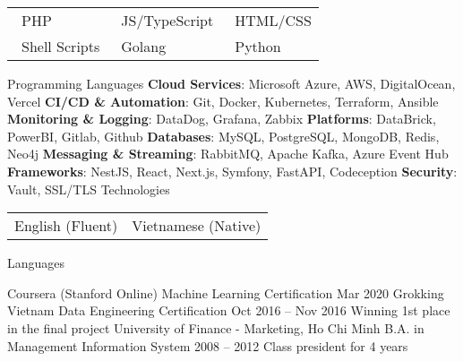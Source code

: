 \documentclass[]{awesome-cv}
\begin{document}
\newpage
{}
\begin{cventries}
	\cventry
	{\def\arraystretch{1.15}{\begin{tabular}{p{3cm}@{\hspace{0.1cm}} @{\hspace{0.1cm}}p{3cm}@{\hspace{0.1cm}} @{\hspace{0.1cm}}p{3cm}@{\hspace{0.1cm}} }
		{\faStar \, PHP} & {\faStarHalfO \, JS/TypeScript} & {\faStarHalfO \, HTML/CSS} \\
		{\faStarHalfO \, Shell Scripts} & {\faStarHalfO \, Golang} & {\faStarHalfO \, Python} \\
		\end{tabular}}}
	{Programming Languages}
	{}
	{}
	{}
	\cventry
	{
		\textbf{Cloud Services}: Microsoft Azure, AWS, DigitalOcean, Vercel \break
        \textbf{CI/CD \& Automation}: Git, Docker, Kubernetes, Terraform, Ansible \break
        \textbf{Monitoring \& Logging}: DataDog, Grafana, Zabbix \break
		\textbf{Platforms}: DataBrick, PowerBI, Gitlab, Github \break
		\textbf{Databases}: MySQL, PostgreSQL, MongoDB, Redis, Neo4j \break
        \textbf{Messaging \& Streaming}: RabbitMQ, Apache Kafka, Azure Event Hub \break
		\textbf{Frameworks}: NestJS, React, Next.js, Symfony, FastAPI, Codeception \break
		\textbf{Security}: Vault, SSL/TLS
	}
	{Technologies}
	{}
	{}
	{}
	\cventry
	{\def\arraystretch{1.15}{\begin{tabular}{p{3cm}@{\hspace{0.1cm}} @{\hspace{0.1cm}}p{3cm}@{\hspace{0.1cm}}}
		{English (Fluent)} & {Vietnamese (Native)} \\
		\end{tabular}}}
	{Languages}
	{}
	{}
	{}
\end{cventries}

\begin{cventries}
	\cventry
	{Coursera (Stanford Online)}
	{Machine Learning Certification}
	{}
	{Mar 2020}
	{}
	\cventry
	{Grokking Vietnam}
	{Data Engineering Certification}
	{}
	{Oct 2016 – Nov 2016}
    {Winning 1st place in the final project}
	\cventry
	{University of Finance - Marketing, Ho Chi Minh}
	{B.A. in Management Information System}
	{}
	{2008 – 2012}
    {Class president for 4 years}

\end{cventries}
\vspace{-2mm}
\end{document}
